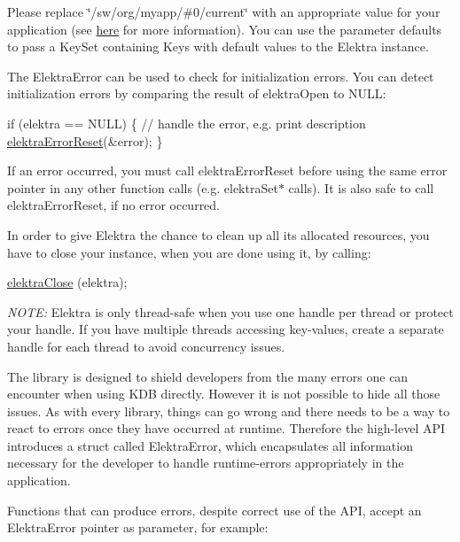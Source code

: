 Please replace {\ttfamily \char`\"{}/sw/org/myapp/\#0/current\char`\"{}} with an appropriate value for your application (see \hyperlink{doc_tutorials_application-integration_md}{here} for more information). You can use the parameter {\ttfamily defaults} to pass a {\ttfamily Key\+Set} containing {\ttfamily Key}s with default values to the {\ttfamily Elektra} instance.

The {\ttfamily Elektra\+Error} can be used to check for initialization errors. You can detect initialization errors by comparing the result of {\ttfamily elektra\+Open} to N\+U\+LL\+:


\begin{DoxyCode}
\textcolor{keywordflow}{if} (elektra == NULL)
\{
  \textcolor{comment}{// handle the error, e.g. print description}
  \hyperlink{group__highlevel_ga591f7ed4b57a341928bf7bb3d7adb693}{elektraErrorReset}(&error);
\}
\end{DoxyCode}


If an error occurred, you must call {\ttfamily elektra\+Error\+Reset} before using the same error pointer in any other function calls (e.\+g. {\ttfamily elektra\+Set$\ast$} calls). It is also safe to call {\ttfamily elektra\+Error\+Reset}, if no error occurred.

In order to give Elektra the chance to clean up all its allocated resources, you have to close your instance, when you are done using it, by calling\+:


\begin{DoxyCode}
\hyperlink{group__highlevel_ga9b688b7250e5f9d8ea6701cc2cc269af}{elektraClose} (elektra);
\end{DoxyCode}


{\itshape N\+O\+TE\+:} Elektra is only thread-\/safe when you use one handle per thread or protect your handle. If you have multiple threads accessing key-\/values, create a separate handle for each thread to avoid concurrency issues.

The library is designed to shield developers from the many errors one can encounter when using K\+DB directly. However it is not possible to hide all those issues. As with every library, things can go wrong and there needs to be a way to react to errors once they have occurred at runtime. Therefore the high-\/level A\+PI introduces a struct called {\ttfamily Elektra\+Error}, which encapsulates all information necessary for the developer to handle runtime-\/errors appropriately in the application.

Functions that can produce errors, despite correct use of the A\+PI, accept an {\ttfamily Elektra\+Error} pointer as parameter, for example\+:


